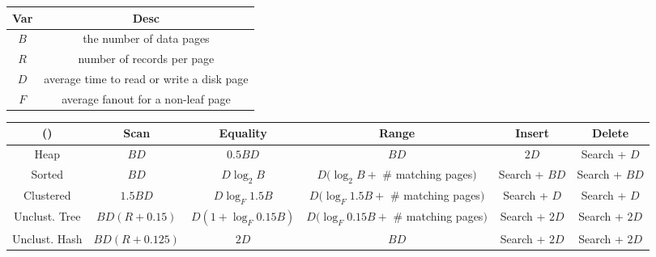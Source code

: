 \documentclass[landscape,8pt]{extarticle}
\begin{document}
\begin{multicols}{4}
\begin{itemize}
\begin{itemize}
\begin{itemize}
            \end{itemize}
        \end{itemize}
    \end{itemize}
    \begin{center}
        \begin{tabular}{ | c | c | } \hline
            Var     & Desc                                      \\ \hline
            $B$     & the number of data pages                  \\ \hline
            $R$     & number of records per page                \\ \hline
            $D$     & average time to read or write a disk page \\ \hline
            $F$     & average fanout for a non-leaf page        \\ \hline
        \end{tabular}
    \end{center}
    \begin{center}
        \begin{adjustbox}{angle=270}
            \begin{tabular}{ | c | c | c | c | c | c | } \hline
                ()            & Scan          & Equality              & Range                                    & Insert        & Delete        \\ \hline
                Heap          & $BD$          & $0.5 BD$              & $BD$                                     & $2D$          & Search + $D$  \\ \hline
                Sorted        & $BD$          & $D \log_2 B$          & $D(\log_2 B +$ \# matching pages$)$      & Search + $BD$ & Search + $BD$ \\ \hline
                Clustered     & $1.5 BD$      & $D \log_F 1.5 B$      & $D(\log_F 1.5B + $ \# matching pages$)$  & Search + $D$  & Search + $D$  \\ \hline
                Unclust. Tree & $BD(R+0.15)$  & $D(1 + \log_F 0.15B)$ & $D(\log_F 0.15B + $ \# matching pages$)$ & Search + $2D$ & Search + $2D$ \\ \hline
                Unclust. Hash & $BD(R+0.125)$ & $2D$                  & $BD$                                     & Search + $2D$ & Search + $2D$ \\ \hline
            \end{tabular}
        \end{adjustbox}
    \end{center}
\end{multicols}
\end{document}
